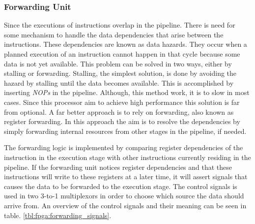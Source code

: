 


\subsubsection{Forwarding Unit} \label{fpga:fitness:sss:forwarding_unit}
Since the executions of instructions overlap in the pipeline.
There is need for some mechanism to handle the data dependencies that arise between the instructions. These dependencies are known as data hazards. They occur when a planned execution of an instruction cannot happen in that cycle because some data is not yet available. This problem can be solved in two ways, either by stalling or forwarding. Stalling, the simplest solution, is done by avoiding the hazard by stalling until the data becomes available. This is accomplished by inserting \emph{NOPs} in the pipeline. Although, this method work, it is to slow in most cases. Since this processor aim to achieve high performance this solution is far from optional. A far better approach is to rely on forwarding, also known as register forwarding. In this approach the aim is to resolve the dependencies by simply forwarding internal resources from other stages in the pipeline, if needed.

The forwarding logic is implemented by comparing register dependencies of the instruction in the execution stage with other instructions currently residing in the pipeline. If the forwarding unit notices register dependencies and that these instructions will write to these registers at a later time, it will assert signals that causes the data to be forwarded to the execution stage. The control signals is used in two 3-to-1 multiplexors in order to choose which source the data should arrive from. An overview of the control signals and their meaning can be seen in table. \ref{tbl:fpga:forwarding_signals}.







